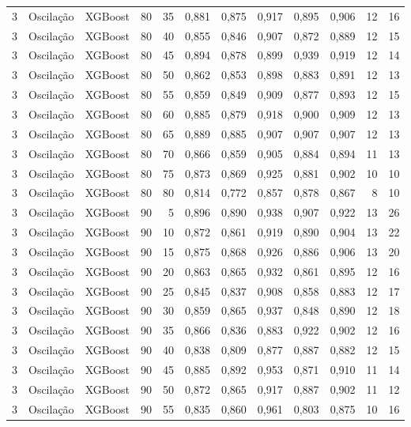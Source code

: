 \begin{longtable}{@{}rllrrrrrrrrr@{}}
3 & Oscilação & XGBoost & 80 & 35 & 0,881 & 0,875 & 0,917 & 0,895 & 0,906 & 12 & 16 \\
3 & Oscilação & XGBoost & 80 & 40 & 0,855 & 0,846 & 0,907 & 0,872 & 0,889 & 12 & 15 \\
3 & Oscilação & XGBoost & 80 & 45 & 0,894 & 0,878 & 0,899 & 0,939 & 0,919 & 12 & 14 \\
3 & Oscilação & XGBoost & 80 & 50 & 0,862 & 0,853 & 0,898 & 0,883 & 0,891 & 12 & 13 \\
3 & Oscilação & XGBoost & 80 & 55 & 0,859 & 0,849 & 0,909 & 0,877 & 0,893 & 12 & 15 \\
3 & Oscilação & XGBoost & 80 & 60 & 0,885 & 0,879 & 0,918 & 0,900 & 0,909 & 12 & 13 \\
3 & Oscilação & XGBoost & 80 & 65 & 0,889 & 0,885 & 0,907 & 0,907 & 0,907 & 12 & 13 \\
3 & Oscilação & XGBoost & 80 & 70 & 0,866 & 0,859 & 0,905 & 0,884 & 0,894 & 11 & 13 \\
3 & Oscilação & XGBoost & 80 & 75 & 0,873 & 0,869 & 0,925 & 0,881 & 0,902 & 10 & 10 \\
3 & Oscilação & XGBoost & 80 & 80 & 0,814 & 0,772 & 0,857 & 0,878 & 0,867 & 8 & 10 \\
3 & Oscilação & XGBoost & 90 & 5 & 0,896 & 0,890 & 0,938 & 0,907 & 0,922 & 13 & 26 \\
3 & Oscilação & XGBoost & 90 & 10 & 0,872 & 0,861 & 0,919 & 0,890 & 0,904 & 13 & 22 \\
3 & Oscilação & XGBoost & 90 & 15 & 0,875 & 0,868 & 0,926 & 0,886 & 0,906 & 13 & 20 \\
3 & Oscilação & XGBoost & 90 & 20 & 0,863 & 0,865 & 0,932 & 0,861 & 0,895 & 12 & 16 \\
3 & Oscilação & XGBoost & 90 & 25 & 0,845 & 0,837 & 0,908 & 0,858 & 0,883 & 12 & 17 \\
3 & Oscilação & XGBoost & 90 & 30 & 0,859 & 0,865 & 0,937 & 0,848 & 0,890 & 12 & 18 \\
3 & Oscilação & XGBoost & 90 & 35 & 0,866 & 0,836 & 0,883 & 0,922 & 0,902 & 12 & 16 \\
3 & Oscilação & XGBoost & 90 & 40 & 0,838 & 0,809 & 0,877 & 0,887 & 0,882 & 12 & 15 \\
3 & Oscilação & XGBoost & 90 & 45 & 0,885 & 0,892 & 0,953 & 0,871 & 0,910 & 11 & 14 \\
3 & Oscilação & XGBoost & 90 & 50 & 0,872 & 0,865 & 0,917 & 0,887 & 0,902 & 11 & 12 \\
3 & Oscilação & XGBoost & 90 & 55 & 0,835 & 0,860 & 0,961 & 0,803 & 0,875 & 10 & 16 \\

\end{longtable}
